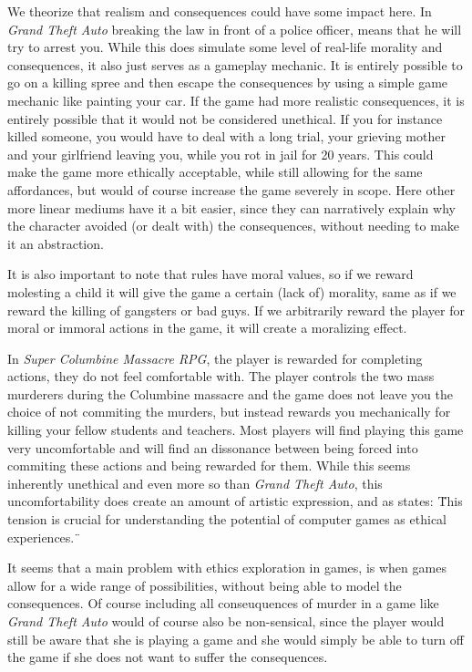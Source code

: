 We theorize that realism and consequences could have some impact here. In \textit{Grand Theft Auto} breaking the law in front of a police officer, means that he will try to arrest you. While this does simulate some level of real-life morality and consequences, it also just serves as a gameplay mechanic. It is entirely possible to go on a killing spree and then escape the consequences by using a simple game mechanic like painting your car. If the game had more realistic consequences, it is entirely possible that it would not be considered unethical. If you for instance killed someone, you would have to deal with a long trial, your grieving mother and your girlfriend leaving you, while you rot in jail for 20 years. This could make the game more ethically acceptable, while still allowing for the same affordances, but would of course increase the game severely in scope. Here other more linear mediums have it a bit easier, since they can narratively explain why the character avoided (or dealt with) the consequences, without needing to make it an abstraction. \

It is also important to note that rules have moral values, so if we reward molesting a child it will give the game a certain (lack of) morality, same as if we reward the killing of gangsters or bad guys. If we arbitrarily reward the player for moral or immoral actions in the game, it will create a moralizing effect.\

In \textit{Super Columbine Massacre RPG}\citep{ledone2005super}, the player is rewarded for completing actions, they do not feel comfortable with. The player controls the two mass murderers during the Columbine massacre and the game does not leave you the choice of not commiting the murders, but instead rewards you mechanically for killing your fellow students and teachers. Most players will find playing this game very uncomfortable and will find an dissonance between being forced into commiting these actions and being rewarded for them. While this seems inherently unethical and even more so than \textit{Grand Theft Auto}, this uncomfortability does create an amount of artistic expression, and as \citep{sicart2011ethics} states: \"This tension is crucial for understanding the potential of computer games as ethical experiences.\" \

It seems that a main problem with ethics exploration in games, is when games allow for a wide range of possibilities, without being able to model the consequences. Of course including all conseuquences of murder in a game like \textit{Grand Theft Auto} would of course also be non-sensical, since the player would still be aware that she is playing a game and she would simply be able to turn off the game if she does not want to suffer the consequences.\

